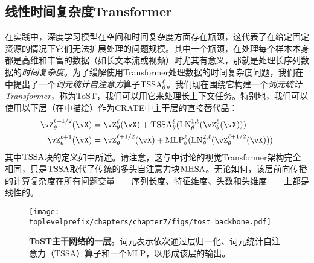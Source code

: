 \documentclass[../../book-main_zh.tex]{subfiles}
\begin{document}

\subsection{线性时间复杂度Transformer}\label{sub:tost_experiments}

在实践中，深度学习模型在空间和时间复杂度方面存在瓶颈，这代表了在给定固定资源的情况下它们无法扩展处理的问题规模。其中一个瓶颈，在处理每个样本本身都是高维和丰富的数据（如长文本流或视频）时尤其有意义，那就是处理长序列数据的\textit{时间复杂度}。为了缓解使用Transformer处理数据的时间复杂度问题，我们在中提出了一个\textit{词元统计自注意力}算子\(\operatorname{TSSA}_{\theta}^{\ell}\)。我们现在围绕它构建一个\textit{词元统计Transformer}，称为ToST，我们可以用它来处理长上下文任务。特别地，我们可以使用以下层（在中描绘）作为CRATE中主干层的直接替代品：
\begin{align}
    \vZ_{\theta}^{\ell + 1/2}(\vX)
    &= \vZ_{\theta}^{\ell}(\vX) + \TSSA_{\theta}^{\ell}(\LN_{\theta}^{1, \ell}(\vZ_{\theta}^{\ell}(\vX))) \\ 
    \vZ_{\theta}^{\ell + 1}(\vX)
    &= \vZ_{\theta}^{\ell + 1/2}(\vX) + \MLP_{\theta}^{\ell}(\LN_{\theta}^{2, \ell}(\vZ_{\theta}^{\ell + 1/2}(\vX)))
\end{align}
其中\(\operatorname{TSSA}\)块的定义如中所述。请注意，这与中讨论的视觉Transformer架构完全相同，只是\(\operatorname{TSSA}\)取代了传统的多头自注意力块\(\operatorname{MHSA}\)。无论如何，该层前向传播的计算复杂度在所有问题变量——序列长度、特征维度、头数和头维度——上都是线性的。

\begin{figure}
    \centering 
    \texttt{[image: \\toplevelprefix/chapters/chapter7/figs/tost\_backbone.pdf]}
    \caption{\small\textbf{ToST主干网络的一层}。词元表示依次通过层归一化、词元统计自注意力（TSSA）算子和一个MLP，以形成该层的输出。}
    \label{fig:tost_backbone}
\end{figure}
\end{document}
